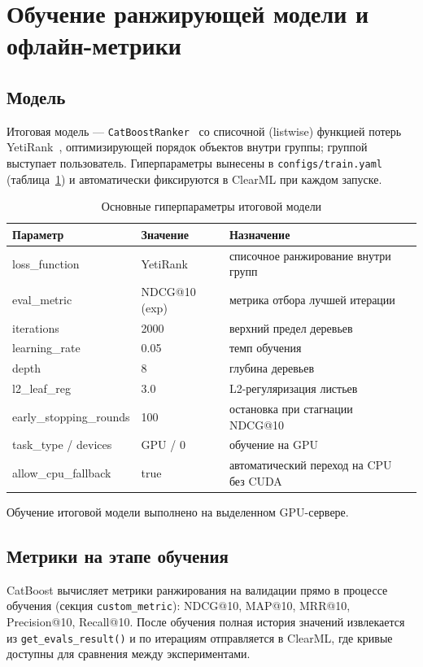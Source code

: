 \section{Обучение ранжирующей модели и офлайн-метрики}

\subsection{Модель}

Итоговая модель --- \texttt{CatBoostRanker}~\cite{catboost-docs} со списочной (listwise) функцией потерь YetiRank~\cite{yetirank}, оптимизирующей порядок объектов внутри группы; группой выступает пользователь.
Гиперпараметры вынесены в \texttt{configs/train.yaml} (таблица~\ref{tab:hyperparams}) и автоматически фиксируются в ClearML при каждом запуске.

\begin{table}[H]
\centering
\caption{Основные гиперпараметры итоговой модели}
\label{tab:hyperparams}
\small
\begin{tabularx}{\textwidth}{@{}l l X@{}}
\toprule
\textbf{Параметр} & \textbf{Значение} & \textbf{Назначение} \\
\midrule
loss\_function & YetiRank & списочное ранжирование внутри групп \\
eval\_metric & NDCG@10 (exp) & метрика отбора лучшей итерации \\
iterations & 2000 & верхний предел деревьев \\
learning\_rate & 0.05 & темп обучения \\
depth & 8 & глубина деревьев \\
l2\_leaf\_reg & 3.0 & L2-регуляризация листьев \\
early\_stopping\_rounds & 100 & остановка при стагнации NDCG@10 \\
task\_type / devices & GPU / 0 & обучение на GPU \\
allow\_cpu\_fallback & true & автоматический переход на CPU без CUDA \\
\bottomrule
\end{tabularx}
\end{table}

Обучение итоговой модели выполнено на выделенном GPU-сервере.

\subsection{Метрики на этапе обучения}

CatBoost вычисляет метрики ранжирования на валидации прямо в процессе обучения (секция \texttt{custom\_metric}): NDCG@10, MAP@10, MRR@10, Precision@10, Recall@10.
После обучения полная история значений извлекается из \texttt{get\_evals\_result()} и по итерациям отправляется в ClearML, где кривые доступны для сравнения между экспериментами.

